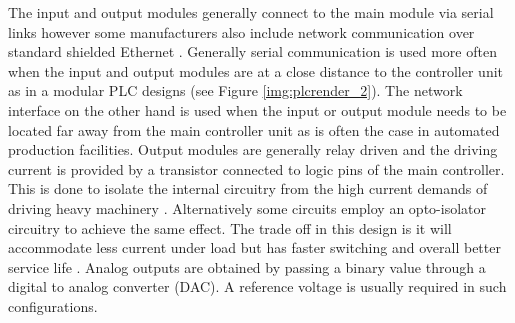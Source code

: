 The input and output modules generally connect to the main module via serial links 
however some manufacturers also include network communication over standard shielded 
Ethernet \cite{rockwell_io,rockwell_tech_pub}. Generally serial communication is used 
more often when the input and output modules are at a close distance to the controller 
unit as in a modular PLC designs  (see Figure \ref{img:plcrender_2}). The network 
interface on the other hand is used when the input or output module needs to be located 
far away from the main controller unit \cite{rockwell_tech_pub} as is often the case in 
automated production facilities. Output modules are generally relay driven and the 
driving current is provided by a transistor connected to logic pins of the main controller.
 This is done to isolate the internal circuitry from the high current demands of 
 driving heavy machinery \cite{plcapp}. Alternatively some circuits employ an opto-isolator 
 circuitry to achieve the same effect. The trade off in this design is it will accommodate 
 less current under load but has faster switching and overall better service life \cite{plcapp}.
  Analog outputs are obtained by passing a binary value through a digital to analog 
  converter (DAC). A reference voltage is usually required in such configurations.

